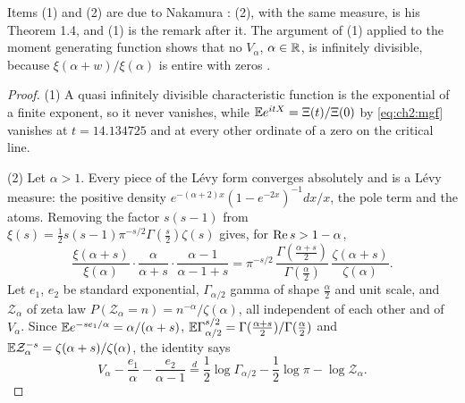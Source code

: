 Items (1) and (2) are due to Nakamura \cite{Nakamura15}: (2), with the same measure, is his Theorem 1.4, and (1) is the remark after it. The argument of (1) applied to the moment generating function shows that no $V_\alpha$, $\alpha\in\mathbb{R}$, is infinitely divisible, because $\xi(\alpha+w)/\xi(\alpha)$ is entire with zeros \cite[Theorem~25.17]{Sato99}.

\begin{proof}
(1) A quasi infinitely divisible characteristic function is the exponential of a finite exponent, so it never vanishes, while $\mathbb{E} e^{itX}=\Xi(t)/\Xi(0)$ by \eqref{eq:ch2:mgf} vanishes at $t=14.134725$ and at every other ordinate of a zero on the critical line.

(2) Let $\alpha>1$. Every piece of the L\'evy form converges absolutely and is a L\'evy measure: the positive density $e^{-(\alpha+2)x}(1-e^{-2x})^{-1}dx/x$, the pole term and the atoms. Removing the factor $s(s-1)$ from $\xi(s)=\frac12s(s-1)\pi^{-s/2}\Gamma(\frac s2)\zeta(s)$ gives, for $\operatorname{Re} s>1-\alpha$,
\[
\frac{\xi(\alpha+s)}{\xi(\alpha)}\cdot\frac{\alpha}{\alpha+s}\cdot\frac{\alpha-1}{\alpha-1+s}=\pi^{-s/2}\,\frac{\Gamma(\frac{\alpha+s}2)}{\Gamma(\frac\alpha2)}\,\frac{\zeta(\alpha+s)}{\zeta(\alpha)} .
\]
Let $e_1$, $e_2$ be standard exponential, $\Gamma_{\alpha/2}$ gamma of shape $\frac\alpha2$ and unit scale, and $\mathcal Z_\alpha$ of zeta law $P(\mathcal Z_\alpha=n)=n^{-\alpha}/\zeta(\alpha)$, all independent of each other and of $V_\alpha$. Since $\mathbb{E} e^{-se_1/\alpha}=\alpha/(\alpha+s)$, $\mathbb{E}\Gamma_{\alpha/2}^{s/2}=\Gamma(\frac{\alpha+s}2)/\Gamma(\frac\alpha2)$ and $\mathbb{E}\mathcal Z_\alpha^{-s}=\zeta(\alpha+s)/\zeta(\alpha)$, the identity says
\[
V_\alpha-\frac{e_1}\alpha-\frac{e_2}{\alpha-1}\stackrel d=\frac12\log\Gamma_{\alpha/2}-\frac12\log\pi-\log\mathcal Z_\alpha .
\]

\end{proof}
